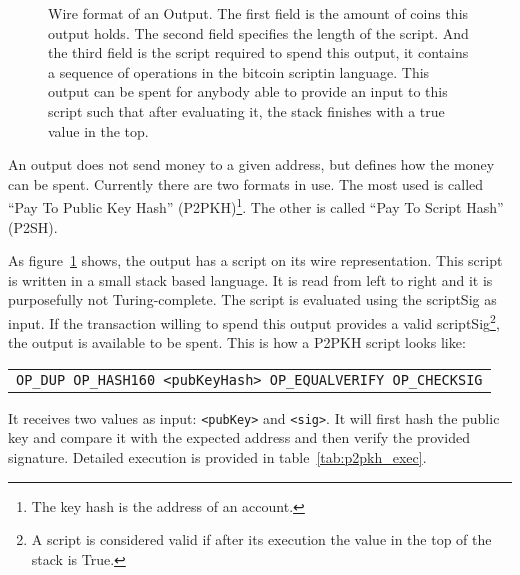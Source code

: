 \begin{figure}[ht]
  \centering
  
  \caption[Wire format of an Output]{Wire format of an Output.
           The first field is the amount of coins this output holds.
           The second field specifies the length of the script.
           And the third field is the script required to spend this output,
             it contains a sequence of operations in the bitcoin scriptin
             language.
           This output can be spent for anybody able to provide an input to this
             script such that after evaluating it, the stack finishes with a
             true value in the top.
             }
  \label{fig:output}
\end{figure}

An output does not send money to a given address, but defines how the money can
  be spent. Currently there are two formats in use. The most used is called
  ``Pay To Public Key Hash'' (P2PKH)\footnote{The key hash is the address of an
  account.}. The other is called ``Pay To Script Hash'' (P2SH).

As figure~\ref{fig:output} shows, the output has a script on its wire
  representation.
This script is written in a small stack based language.
It is read from left to right and it is purposefully not Turing-complete.
The script is evaluated using the scriptSig as input. If the transaction willing
  to spend this output provides a valid scriptSig\footnote{A script is
  considered valid if after its execution the value in the top of the stack is
  True.}, the output is available to be spent. This is how a P2PKH script looks
  like:

\begin{center}
  \begin{tabular}{|c|}
    \texttt{OP\_DUP OP\_HASH160 <pubKeyHash> OP\_EQUALVERIFY OP\_CHECKSIG}
  \end{tabular}
\end{center}

It receives two values as input:  \lstinline{<pubKey>} and \lstinline{<sig>}.
It will first hash the public key and compare it with the expected address and
  then verify the provided signature.
Detailed execution is provided in table~\ref{tab:p2pkh_exec}.

